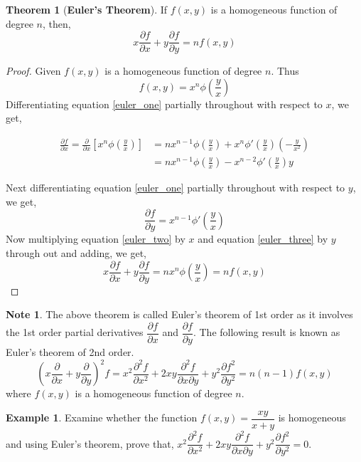 \documentclass[../../main.tex]{subfiles}
\theoremstyle{definition}
\newtheorem{theorem}{Theorem}[section]
\newtheorem{example}{Example}[section]
\newtheorem*{note}{Note}
\begin{document}
\begin{theorem}[\textbf{Euler's Theorem}]
If $f(x,y)$ is a homogeneous function of degree $n$, then,
\[
 x\frac{\partial f}{\partial x}+y\frac{\partial f}{\partial y}=nf(x,y)
\]
\end{theorem}

\begin{proof}
Given $f(x,y)$ is a homogeneous function of degree $n$. Thus 
\begin{equation}\label{euler_one}
f(x,y)=x^n\phi(\frac{y}{x})
\end{equation}
Differentiating equation \ref{euler_one} partially throughout with respect to $x$, we get, 

\begin{align}\label{euler_two}
\frac{\partial f}{\partial x}=\frac{\partial }{\partial x}\left[x^n\phi(\frac{y}{x})\right] &= nx^{n-1}\phi(\frac{y}{x})+x^n\phi'(\frac{y}{x})(-\frac{y}{x^2}) \nonumber \\
&= nx^{n-1}\phi(\frac{y}{x})-x^{n-2}\phi'(\frac{y}{x})y
\end{align}

Next differentiating equation \ref{euler_one} partially throughout with respect to $y$, we get, 
 \begin{equation}\label{euler_three}
   \frac{\partial f}{\partial y} = x^{n-1}\phi'(\frac{y}{x}) 
 \end{equation}
Now multiplying equation \ref{euler_two} by $x$ and equation \ref{euler_three} by $y$ through out and adding, we get,
\[
x\frac{\partial f}{\partial x}+y\frac{\partial f}{\partial y}=nx^n\phi(\frac{y}{x})=nf(x,y)
\]
\end{proof}

\begin{note}
The above theorem is called Euler's theorem of 1st order as it involves the 1st order partial derivatives $\dfrac{\partial f}{\partial x}$ and $\dfrac{\partial f}{\partial y}$.
The following result is known as Euler's theorem of 2nd order.
\[
(x\frac{\partial}{\partial x}+y\frac{\partial}{\partial y})^2f=x^2\frac{\partial^2f}{\partial x^2}+2xy\frac{\partial^2f}{\partial x\partial y}+y^2\frac{\partial f^2}{\partial y^2}=n(n-1)f(x,y)
\]
where $f(x,y)$ is a homogeneous function of degree $n$.
\end{note}


\begin{example}
Examine whether the function $f(x,y)=\dfrac{xy}{x+y}$ is homogeneous and using Euler's theorem, prove that, $x^2\dfrac{\partial^2f}{\partial x^2}+2xy\dfrac{\partial^2f}{\partial x\partial y}+y^2\dfrac{\partial f^2}{\partial y^2}=0$.    
\end{example}
\end{document}
